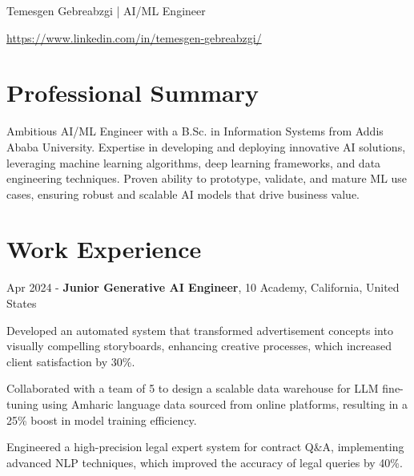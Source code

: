 \documentclass{modern} %
\begin{document}
\begin{header}
\fontsize{25pt}{25pt}\selectfont Temesgen Gebreabzgi | AI/ML Engineer %

\vspace{5pt}

\normalsize
 \quad
\kern 5.0pt%
 \quad
\kern 5.0pt%
 \quad
\kern 5.0pt%
    {\faLinkedin} \href{https://www.linkedin.com/in/temesgen{-}gebreabzgi/}{https://www.linkedin.com/in/temesgen{-}gebreabzgi/} 
 \quad

\vspace{5pt}
\end{header}

\section{Professional Summary}
\begin{onecolentry}
    {}{}{Ambitious AI/ML Engineer with a B.Sc. in Information Systems from Addis Ababa University. Expertise in developing and deploying innovative AI solutions, leveraging machine learning algorithms, deep learning frameworks, and data engineering techniques. Proven ability to prototype, validate, and mature ML use cases, ensuring robust and scalable AI models that drive business value.}
\end{onecolentry}

\section{Work Experience}
    \begin{twocolentry}{
        Apr 2024 -  
    }
        \textbf{Junior Generative AI Engineer}, 10 Academy, California, United States
    \end{twocolentry}

    \vspace{0.10cm}
    \begin{onecolentry}
        \begin{highlights}
                            \item Developed an automated system that transformed advertisement concepts into visually compelling storyboards, enhancing creative processes, which increased client satisfaction by 30\%. 
                            \item Collaborated with a team of 5 to design a scalable data warehouse for LLM fine{-}tuning using Amharic language data sourced from online platforms, resulting in a 25\% boost in model training efficiency. 
                            \item Engineered a high{-}precision legal expert system for contract Q\&A, implementing advanced NLP techniques, which improved the accuracy of legal queries by 40\%. 
                    \end{highlights}
    \end{onecolentry}
\end{document}
